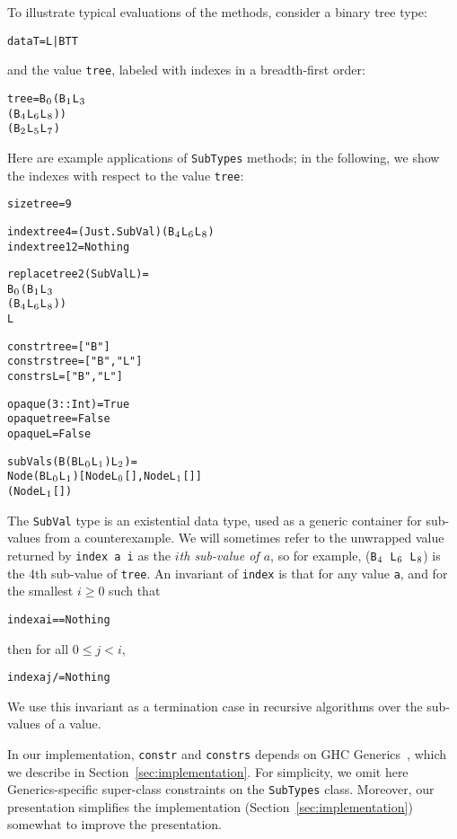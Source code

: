 \documentclass{sigplanconf}
\newenvironment{code}{\begin{alltt}}{\end{alltt}}
\newcommand{\ttp}[1]{\texttt{#1}}
\newcommand{\sub}[1]{\(\sb{#1}\)}
\begin{document}
\noindent
To illustrate typical evaluations of the methods, consider a binary tree type:
%
\begin{code}
data T = L | B T T
\end{code}
%
\noindent
and the value \ttp{tree}, labeled with indexes in a breadth-first order:
%
\begin{code}
tree = B\sub{0} (B\sub{1} L\sub{3}
             (B\sub{4} L\sub{6} L\sub{8}))
          (B\sub{2} L\sub{5} L\sub{7})
\end{code}
%
\noindent
Here are example applications of \ttp{SubTypes} methods; in the following, we
show the indexes with respect to the value \ttp{tree}:
%
\begin{code}
size tree = 9

index tree 4  = (Just . SubVal) (B\sub{4} L\sub{6} L\sub{8})
index tree 12 = Nothing

replace tree 2 (SubVal L) =
  B\sub{0} (B\sub{1} L\sub{3}
        (B\sub{4} L\sub{6} L\sub{8}))
     L

constr  tree = ["B"]
constrs tree = ["B", "L"]
constrs L    = ["B", "L"]

opaque (3 :: Int) = True
opaque tree       = False
opaque L          = False

subVals (B (B L\sub{0} L\sub{1}) L\sub{2}) =
  Node (B L\sub{0} L\sub{1}) [Node L\sub{0} [], Node L\sub{1} []]
       (Node L\sub{1} [])
\end{code}
%
\noindent
The \ttp{SubVal} type is an existential data type, used as a generic container
for sub-values from a counterexample.  We will sometimes refer to the unwrapped
value returned by \ttp{index a i} as the \emph{$i$th sub-value of $a$}, so for
example, (\ttp{B\sub{4} L\sub{6} L\sub{8}}) is the 4th sub-value of \ttp{tree}.
An invariant of \ttp{index} is that for any value \ttp{a}, and for the smallest
$i \geq 0$ such that
%
\begin{code}
index a i == Nothing
\end{code}
%
\noindent
then for all $0 \leq j < i$,
%
\begin{code}
index a j /= Nothing
\end{code}
\noindent
We use this invariant as a termination case in recursive algorithms over the
sub-values of a value.

In our implementation, \ttp{constr} and \ttp{constrs} depends on GHC
Generics~\cite{generics}, which we describe in Section~\ref{sec:implementation}.
For simplicity, we omit here Generics-specific super-class constraints on the
\ttp{SubTypes} class.  Moreover, our presentation simplifies the implementation
(Section~\ref{sec:implementation}) somewhat to improve the presentation.
\end{document}
